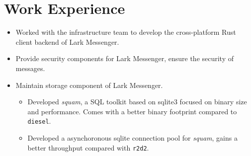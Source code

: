 \documentclass{resume}
\newcommand{\en}[1]{#1}
\newcommand{\zh}[1]{}
\begin{document}
\section{\en{Work Experience}\zh{工作经历}}
\en{}
\zh{\datedsubsection{\textbf{\href{https://www.bytedance.com/}{字节跳动}}}{09/2021 -- 至今}}
\en{}
\zh{\role{飞书跨平台基础架构}{Rust 研发实习}}
\begin{itemize}
      \item \en{
                Worked with the infrastructure team to develop the cross-platform 
                Rust client backend of Lark Messenger.
            }
            \zh{合作开发飞书客户端的跨平台 Rust SDK。}
      \item \en{
                Provide security components for Lark Messenger, ensure the security of messages.
                }
            \zh{
                为飞书消息业务提供安全组件，确保消息的安全性。
            }
      \item \en{
                Maintain storage component of Lark Messenger.
            }
            \zh{
                维护飞书 SDK 的存储组件。
            }
      \begin{itemize}
                  \item \en{
                            Developed \textit{squam}, a SQL toolkit based on sqlite3 focused on binary size and performance.
                            Comes with a better binary footprint compared to \texttt{diesel}.
                        }
                        \zh{
                            开发了 \textit{squam}，一个基于 sqlite3 的 SQL 工具库，专注于二进制大小和性能。在测试中，相较于 \texttt{diesel}，\textit{squam} 的二进制体积更小，编译时间更短。
                        }
                  \item \en{
                            Developed a asynchoronous sqlite connection pool for \textit{squam}, gains a better throughput compared with \texttt{r2d2}.
}
\end{itemize}
\end{itemize}
\end{document}
